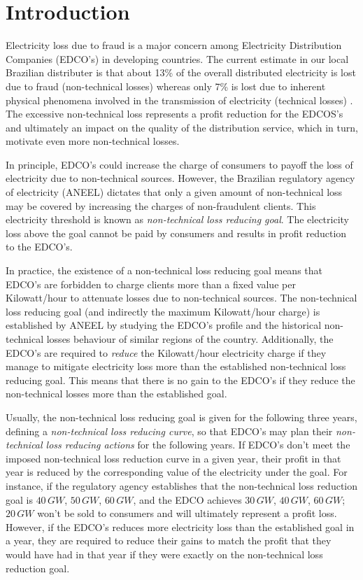 \section{Introduction}
Electricity loss due to fraud is a major concern among Electricity Distribution Companies (EDCO's) in developing countries. 
The current estimate in our local Brazilian distributer is that about 13\% of the overall distributed electricity is lost due to fraud (non-technical losses)
whereas only 7\% is lost due to inherent physical phenomena involved in the transmission of electricity (technical losses) \cite{ANEEL2012}. 
The excessive non-technical loss represents a profit reduction for the
EDCOS's and ultimately an impact on the quality of the distribution service, which in turn, motivate even more non-technical losses.

In principle, EDCO's could increase the charge of consumers to payoff the loss of electricity due to non-technical sources.
However, the Brazilian regulatory agency of electricity (ANEEL) dictates that only a given amount of non-technical loss
may be covered by increasing the charges of non-fraudulent clients. 
This electricity threshold is known as \textit{non-technical loss reducing goal}.
The electricity loss above the goal cannot be paid by consumers and results in 
profit reduction to the EDCO's.

In practice, the existence of a non-technical loss reducing goal means that EDCO's are forbidden to charge clients more than a fixed value per Kilowatt/hour to
attenuate losses due to non-technical sources.
The non-technical loss reducing goal (and indirectly the maximum Kilowatt/hour charge) is established by ANEEL by studying the EDCO's 
profile and the historical non-technical losses behaviour of similar regions of the country.
Additionally, the EDCO's are required to \textit{reduce} the Kilowatt/hour electricity charge if they manage to mitigate
electricity loss more than the established non-technical loss reducing goal. 
This means that there is no gain to the EDCO's if they reduce the non-technical losses more than the established goal.

Usually, the non-technical loss reducing goal is given for the following three years,
defining a \textit{non-technical loss reducing curve},
so that EDCO's may plan their \textit{non-technical loss reducing actions} for the
following years.
If EDCO's don't meet the imposed non-technical loss reduction curve in a given year, their profit in that year
is reduced by the corresponding value of the electricity under the goal. For instance, if the regulatory
agency establishes that the non-technical loss reduction goal is $40\,GW$, $50\,GW$, $60\,GW$, and the EDCO achieves $30\,GW$, $40\,GW$, $60\,GW$;
$20\,GW$ won't be sold to consumers and will ultimately represent a profit loss.
However, if the EDCO's reduces more electricity loss than the established goal in a year,
they are required to reduce their gains to match the profit that they would have had in that year if they were exactly
on the non-technical loss reduction goal.

